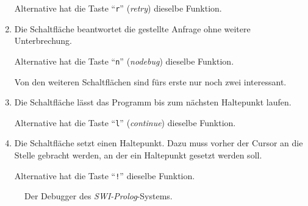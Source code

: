 \begin{enumerate}
      Alternative hat die Taste ``\texttt{r}'' (\emph{retry}) dieselbe Funktion.
\item Die Schaltfl\"{a}che 
      beantwortet die gestellte Anfrage ohne weitere Unterbrechung.

      Alternative hat die Taste ``\texttt{n}'' (\emph{nodebug}) dieselbe Funktion.

      Von den weiteren Schaltfl\"{a}chen sind f\"{u}rs erste nur noch zwei interessant.
\item Die Schaltfl\"{a}che 
       l\"{a}sst das Programm bis zum n\"{a}chsten Haltepunkt laufen.

      Alternative hat die Taste ``\texttt{l}'' (\emph{continue}) dieselbe Funktion.
\item Die Schaltfl\"{a}che  
      setzt einen Haltepunkt.  Dazu muss vorher der Cursor an die Stelle gebracht
      werden, an der ein Haltepunkt gesetzt werden soll.

      Alternative hat die Taste ``\texttt{!}''  dieselbe Funktion.
\end{enumerate}

\begin{figure}[!h]
  \centering
  \caption{Der Debugger des \textsl{SWI-Prolog}-Systems.}
  \label{fig:debugger}
\end{figure}

